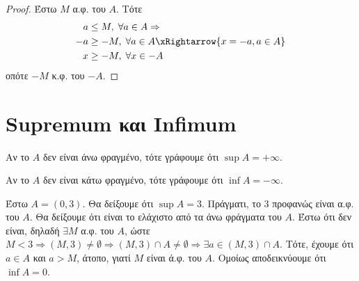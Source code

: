 \documentclass[main.tex]{subfiles}
\begin{document}
\begin{proof}
    Έστω $M$ α.φ. του $A$. Τότε 
    \begin{align*}
        a &\leq M, \; \forall a \in A \Rightarrow  \\
        -a &\geq -M, \; \forall a \in A \xRightarrow{x= -a, a \in A} \\
        x &\geq -M, \; \forall x \in -A
    \end{align*}
    οπότε $ -M $  κ.φ. του $ -A $.
\end{proof}

\section{Supremum και Infimum}



\begin{rem}
\item {}
    \begin{myitemize}
        \item Αν το $A$ δεν είναι άνω φραγμένο, τότε γράφουμε ότι $ \sup A = 
            + \infty $.
        \item Αν το $A$ δεν είναι κάτω φραγμένο, τότε γράφουμε ότι $ \inf A = 
            - \infty $.
    \end{myitemize}
\end{rem}

\begin{example}
    Έστω $ A = (0,3) $. Θα δείξουμε ότι $ \sup A = 3 $. Πράγματι, 
    το $ 3 $ προφανώς είναι α.φ. του $A$. Θα δείξουμε ότι είναι το
    ελάχιστο από τα άνω φράγματα του $A$. Έστω ότι δεν είναι, δηλαδή 
    $ \exists M $ α.φ. του $A$, ώστε $ M < 3 \Rightarrow (M,3) \neq 
    \emptyset \Rightarrow (M,3) \cap A \neq \emptyset \Rightarrow \exists 
    a \in (M,3) \cap A $. Τότε, έχουμε ότι $ a \in A $ και $ a > M $, 
    άτοπο, γιατί $M$ είναι ά.φ. του $A$. Ομοίως αποδεικνύουμε ότι $ 
    \inf A = 0$.
\end{example}
\end{document}
